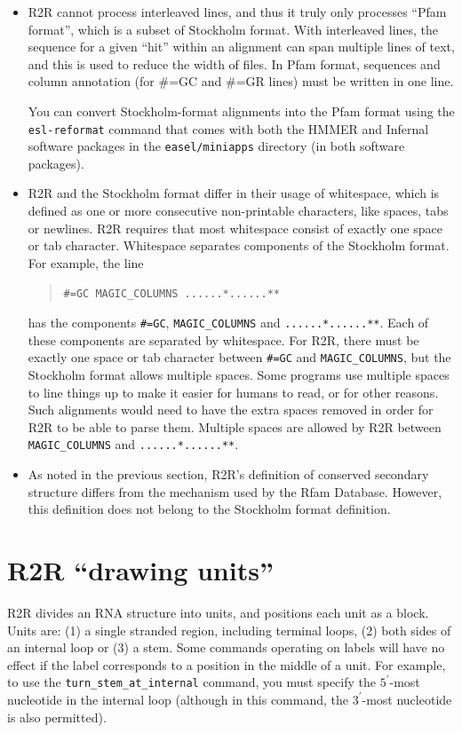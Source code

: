 \documentclass[letterpaper,12pt]{report}
\newcommand{\example}[1]{
\begin{quote}
{\raggedright
#1
}
\end{quote}
}
\newcommand{\examplett}[1]{
\example{{\tt #1}}
}
\begin{document}
\begin{itemize}
\item R2R cannot process interleaved lines, and thus it truly only processes ``Pfam format'', which is a subset of Stockholm format.  With interleaved lines, the sequence for a given ``hit'' within an alignment can span multiple lines of text, and this is used to reduce the width of files.  In Pfam format, sequences and column annotation (for \#=GC and \#=GR lines) must be written in one line.

You can convert Stockholm-format alignments into the Pfam format using the {\tt esl-reformat} command that comes with both the HMMER and Infernal software packages in the {\tt easel/miniapps} directory (in both software packages).
\item R2R and the Stockholm format differ in their usage of whitespace, which is defined as one or more consecutive non-printable characters, like spaces, tabs or newlines.  R2R requires that most whitespace consist of exactly one space or tab character.  Whitespace separates components of the Stockholm format.  For example, the line
  \examplett{\#=GC MAGIC\_COLUMNS  ......*......**}
  has the components {\tt\#=GC}, {\tt MAGIC\_COLUMNS} and {\tt ......*......**}.  Each of these components are separated by whitespace.  For R2R, there must be exactly one space or tab character between {\tt\#=GC} and {\tt MAGIC\_COLUMNS}, but the Stockholm format allows multiple spaces.  Some programs use multiple spaces to line things up to make it easier for humans to read, or for other reasons.  Such alignments would need to have the extra spaces removed in order for R2R to be able to parse them.  Multiple spaces are allowed by R2R between {\tt MAGIC\_COLUMNS} and {\tt ......*......**}.
  \item As noted in the previous section, R2R's definition of conserved secondary structure differs from the mechanism used by the Rfam Database.  However, this definition does not belong to the Stockholm format definition.
\end{itemize}

\section{R2R ``drawing units''}
\label{drawingunits}

R2R divides an RNA structure into units, and positions each unit as a block.
Units are: (1) a single
stranded region, including terminal loops, (2) both sides of an
internal loop or (3) a stem. 
Some commands operating on labels will have no effect if the label corresponds to a position in the middle
of a unit.
For example, to use the {\tt turn\_stem\_at\_internal} command, you must specify the $5^\prime$-most nucleotide
in the internal loop (although in this command, the $3^\prime$-most nucleotide is also permitted).
\end{document}
